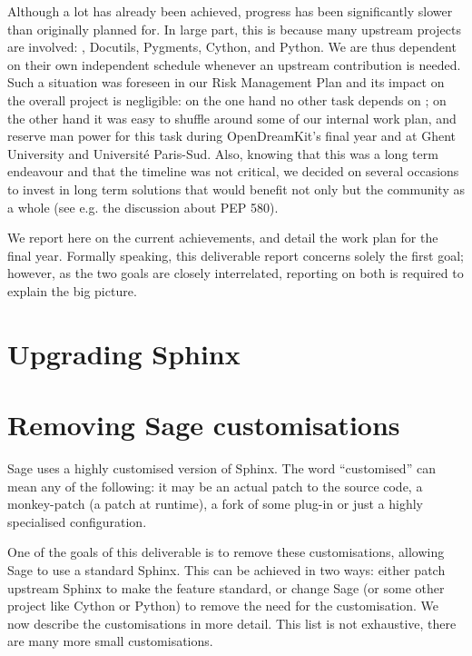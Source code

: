 \documentclass{deliverablereport}
\begin{document}
Although a lot has already been achieved, progress has been
significantly slower than originally planned for. In large part, this
is because many upstream projects are involved: \Sphinx, Docutils,
Pygments, Cython, and Python. We are thus dependent on their own
independent schedule whenever an upstream contribution is needed. Such
a situation was foreseen in our Risk Management Plan and its impact on
the overall project is negligible: on the one hand no other task
depends on ; on the other hand it was easy to
shuffle around some of our internal work plan, and reserve man power
for this task during OpenDreamKit's final year and at Ghent University
and Université Paris-Sud. Also, knowing that this was a long term
endeavour and that the timeline was not critical, we decided on
several occasions to invest in long term solutions that would benefit
not only \Sage but the community as a whole (see e.g. the discussion
about PEP 580).

We report here on the current achievements, and detail the work plan for the
final year. Formally speaking, this deliverable report concerns solely the
first goal; however, as the two goals are closely interrelated, reporting on
both is required to explain the big picture.


\section{Upgrading Sphinx}


\section{Removing Sage customisations}

Sage uses a highly customised version of Sphinx.
The word ``customised'' can mean any of the following:
it may be an actual patch to the source code,
a monkey-patch (a patch at runtime),
a fork of some plug-in or just a highly specialised configuration.

One of the goals of this deliverable is to remove these
customisations, allowing Sage to use a standard Sphinx.
This can be achieved in two ways:
either patch upstream Sphinx to make the feature standard,
or change Sage (or some other project like Cython or Python)
to remove the need for the customisation.
We now describe the customisations in more detail.
This list is not exhaustive, there are many more small
customisations.
\end{document}

